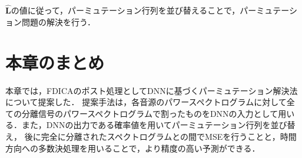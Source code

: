 $\widehat{\bm{L}}$の値に従って，パーミュテーション行列を並び替えることで，パーミュテーション問題の解決を行う．

\section{本章のまとめ}
\label{sec:3matome}
本章では，FDICAのポスト処理としてDNNに基づくパーミュテーション解決法について提案した．
提案手法は，各音源のパワースペクトログラムに対して全ての分離信号のパワースペクトログラムで割ったものをDNNの入力として用いる．また，DNNの出力である確率値を用いてパーミュテーション行列を並び替え，
後に完全に分離されたスペクトログラムとの間でMSEを行うことと，時間方向への多数決処理を用いることで，より精度の高い予測ができる．